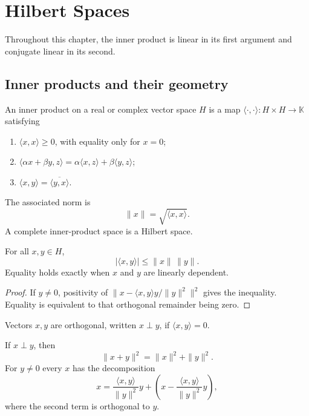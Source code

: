 \chapter{Hilbert Spaces}

Throughout this chapter, the inner product is linear in its first argument and
conjugate linear in its second.

\section{Inner products and their geometry}

\begin{notedefinition}
An inner product on a real or complex vector space $H$ is a map
$\langle\cdot,\cdot\rangle\colon H\times H\to\mathbb K$ satisfying
\begin{enumerate}
  \item $\langle x,x\rangle\ge0$, with equality only for $x=0$;
  \item $\langle \alpha x+\beta y,z\rangle
        =\alpha\langle x,z\rangle+\beta\langle y,z\rangle$;
  \item $\langle x,y\rangle=\overline{\langle y,x\rangle}$.
\end{enumerate}
The associated norm is
\[
  \|x\|=\sqrt{\langle x,x\rangle}.
\]
A complete inner-product space is a Hilbert space.
\end{notedefinition}

\begin{notetheorem}
For all $x,y\in H$,
\[
  |\langle x,y\rangle|\le\|x\|\,\|y\|.
\]
Equality holds exactly when $x$ and $y$ are linearly dependent.
\end{notetheorem}

\begin{proof}
If $y\ne0$, positivity of
$\|x-\langle x,y\rangle y/\|y\|^2\|^2$ gives the inequality.  Equality is
equivalent to that orthogonal remainder being zero.
\end{proof}

\begin{notedefinition}[Orthogonality]
Vectors $x,y$ are orthogonal, written $x\perp y$, if
$\langle x,y\rangle=0$.
\end{notedefinition}

\begin{notetheorem}
If $x\perp y$, then
\[
  \|x+y\|^2=\|x\|^2+\|y\|^2.
\]
For $y\ne0$ every $x$ has the decomposition
\[
  x=\frac{\langle x,y\rangle}{\|y\|^2}y
    +\left(x-\frac{\langle x,y\rangle}{\|y\|^2}y\right),
\]
where the second term is orthogonal to $y$.
\end{notetheorem}

